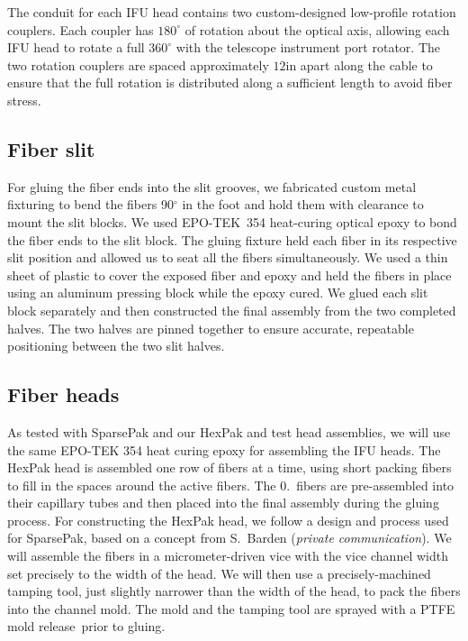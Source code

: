 The conduit for each IFU head contains two custom-designed low-profile
rotation couplers.  Each coupler has $180^{\circ}$ of rotation about the
optical axis, allowing each IFU head to rotate a full $360^{\circ}$ with the
telescope instrument port rotator.  The two rotation couplers are spaced
approximately $12$in apart along the cable to ensure that the full rotation is
distributed along a sufficient length to avoid fiber stress.


\subsection{Fiber slit}
\label{GPBsub:sec:slitconstruct}
For gluing the fiber ends into the slit grooves, we fabricated custom metal
fixturing to bend the fibers 90$^{\circ}$ in the foot and hold them with
clearance to mount the slit blocks.  We used EPO-TEK\footnotemark\ 354
heat-curing optical epoxy to bond the fiber ends to the slit block.
 The gluing fixture held each fiber in its respective slit
position and allowed us to seat all the fibers simultaneously.  We used a thin
sheet of plastic to cover the exposed fiber and epoxy and held the fibers in
place using an aluminum pressing block while the epoxy cured.  We glued each
slit block separately and then constructed the final assembly from the two
completed halves.  The two halves are pinned together to ensure accurate,
repeatable positioning between the two slit halves.

\subsection{Fiber heads}
\label{subsec:headconstruct}
As tested with SparsePak and our HexPak and \GP test head assemblies, we
will use the same EPO-TEK 354 heat curing epoxy for assembling the IFU heads.
The HexPak head is assembled one row of fibers at a time, using short packing
fibers to fill in the spaces around the active fibers.  The 0.\ fibers
are pre-assembled into their capillary tubes and then placed into the final
assembly during the gluing process.  For constructing the HexPak head, we
follow a design and process used for SparsePak, based on a concept from
S.\ Barden (\emph{private communication}).  We will assemble the fibers in a
micrometer-driven vice with the vice channel width set precisely to the width
of the head.  We will then use a precisely-machined tamping tool, just
slightly narrower than the width of the head, to pack the fibers into the
channel mold.  The mold and the tamping tool are sprayed with a PTFE mold
release\footnotemark[1]\ prior to gluing.  


